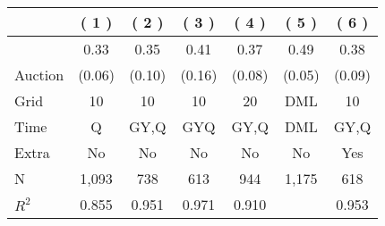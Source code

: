 
\begin{tabular}{lcccccc}
\toprule
 & ( 1 ) & ( 2 ) & ( 3 ) & ( 4 ) & ( 5 ) & ( 6 )\\
\midrule
 & 0.33 & 0.35 & 0.41 & 0.37 & 0.49 & 0.38\\

\multirow{-2}{*}{\raggedright\arraybackslash Auction} & (0.06) & (0.10) & (0.16) & (0.08) & (0.05) & (0.09)\\

\midrule
Grid & 10 & 10 & 10 & 20 & DML & 10\\

Time & Q & GY,Q & GYQ & GY,Q & DML & GY,Q\\

Extra & No & No & No & No & No & Yes\\

N & 1,093 & 738 & 613 & 944 & 1,175 & 618\\

$R^2$ & 0.855 & 0.951 & 0.971 & 0.910 &  & 0.953\\
\bottomrule
\end{tabular}
